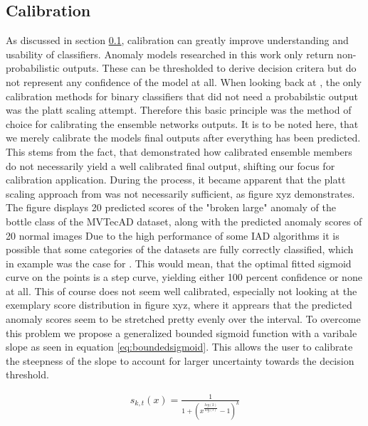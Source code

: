 \subsection{Calibration}
\label{sec:Calibration}

As discussed in section \ref{sec:Calibration}, calibration can greatly improve understanding and usability of classifiers. Anomaly models researched in this work only return non-probabilistic 
outputs. These can be thresholded to derive decision critera but do not represent any confidence of the model at all. When looking back at \cite{Guo_2017_tempscalingetc}, the only calibration 
methods for binary classifiers that did not need a probabilstic output was the platt scaling attempt. Therefore this basic principle was the method of choice for calibrating the ensemble networks 
outputs. It is to be noted here, that we merely calibrate the models final outputs after everything has been predicted. This stems from the fact, that \cite{Wu_2021_shouldbecalibrated} demonstrated 
how calibrated ensemble members do not necessarily yield a well calibrated final output, shifting our focus for calibration application. During the process, it became apparent that the platt 
scaling approach from \cite{Guo_2017_tempscalingetc} was not necessarily sufficient, as figure xyz demonstrates. The figure displays 20 predicted scores of the "broken large" anomaly of the bottle class of the MVTecAD dataset, 
along with the predicted anomaly scores of 20 normal images Due to the high performance of some IAD algorithms it is possible that some categories 
of the datasets are fully correctly classified, which in example was the case for . This would mean, that the optimal fitted sigmoid curve on the points 
is a step curve, yielding either 100 percent confidence or none at all. This of course does not seem well calibrated, especially not looking at the exemplary score distribution in figure xyz, where it 
apprears that the predicted anomaly scores seem to be stretched pretty evenly over the interval. To overcome this problem 
we propose a generalized bounded sigmoid function with a varibale slope \cite{bounded_sigmoid} as seen in equation \ref{eq:boundedsigmoid}. This allows the user to calibrate the steepness of the slope to account for larger uncertainty 
towards the decision threshold.

\begin{equation}
    \label{eq:boundedsigmoid}
    \begin{split}
        s_{k, t}(x) = \frac{1}{1 + (x^{\frac{log(2)}{log(t)}} - 1)^{k}}
    \end{split}
\end{equation}

